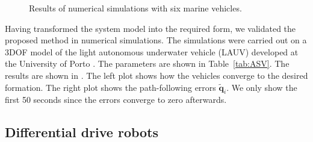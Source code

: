 \begin{figure*}[!htbp]
    \centering
    \begin{subfigure}[c]{0.48\textwidth}
        \centering
        
        
    \end{subfigure}
    \begin{subfigure}[c]{0.48\textwidth}
        \centering
        
        
        
    \end{subfigure}
    \caption{Results of numerical simulations with six marine vehicles.}
    \label{fig:ASV_simulations}
    
\end{figure*}

Having transformed the system model into the required form, we validated the proposed method in numerical simulations.
The simulations were carried out on a 3DOF model of the light autonomous underwater vehicle (LAUV) developed at the University of Porto \cite{sousa_LAUV_2012}.
The parameters are shown in Table~\ref{tab:ASV}.
The results are shown in .
The left plot shows how the vehicles converge to the desired formation.
The right plot shows the path-following errors $\widetilde{\bm{q}}_i$.
We only show the first 50 seconds since the errors converge to zero afterwards.


\subsection{Differential drive robots}

